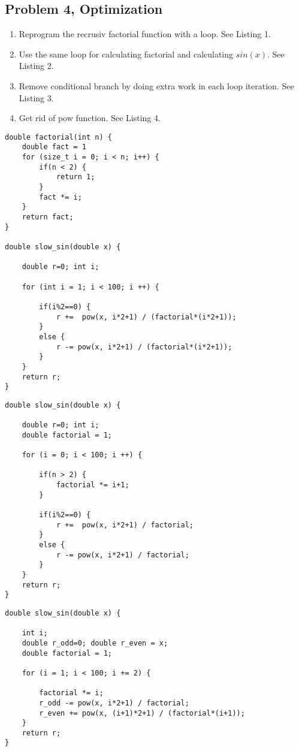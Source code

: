 \documentclass{article}
\begin{document}
\subsection{Problem 4, Optimization}
\begin{enumerate}
    \item Reprogram the recrusiv factorial function with a loop. See Listing 1.
    \item Use the same loop for calculating factorial and calculating $sin(x)$. See Listing 2.
    \item Remove conditional branch by doing extra work in each loop iteration. See Listing 3.
    \item Get rid of pow function. See Listing 4.
    
\end{enumerate}

\begin{lstlisting}[caption={Factorial function operates using a loop}]
double factorial(int n) {
	double fact = 1
	for (size_t i = 0; i < n; i++) {
		if(n < 2) {
			return 1;
		}
		fact *= i;
	}
	return fact;
}

double slow_sin(double x) {

	double r=0; int i;

	for (int i = 1; i < 100; i ++) {

		if(i%2==0) {
			r +=  pow(x, i*2+1) / (factorial*(i*2+1));
		}
		else {
			r -= pow(x, i*2+1) / (factorial*(i*2+1));
		}
	}
	return r;
}
\end{lstlisting}
\newpage
\begin{lstlisting}[caption={Calculate factorial in the slow\_sin loop.}]
double slow_sin(double x) {

	double r=0; int i;
	double factorial = 1;

	for (i = 0; i < 100; i ++) {

		if(n > 2) {
			factorial *= i+1;
		}

		if(i%2==0) {
			r +=  pow(x, i*2+1) / factorial;
		}
		else {
			r -= pow(x, i*2+1) / factorial;
		}
	}
	return r;
}
\end{lstlisting}
\begin{lstlisting}[caption=Getting rid of conditional branches from the \texttt{slow\_sin} loop instead.]
double slow_sin(double x) {
    
    int i;
	double r_odd=0; double r_even = x;
	double factorial = 1;

	for (i = 1; i < 100; i += 2) {

		factorial *= i;
		r_odd -= pow(x, i*2+1) / factorial;
		r_even += pow(x, (i+1)*2+1) / (factorial*(i+1));
	}
	return r;
}
\end{lstlisting}
\newpage
\end{document}
